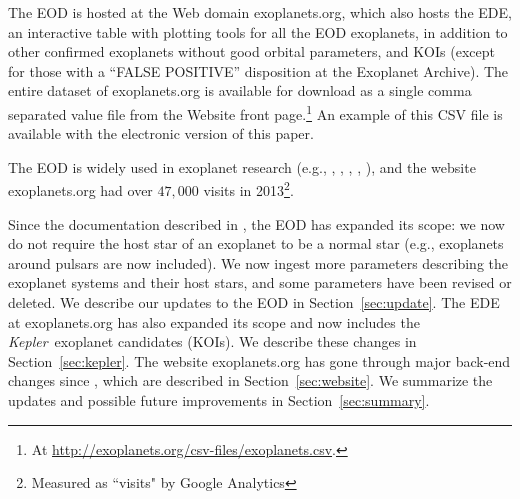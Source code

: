 \documentclass[11pt,preprint]{aastex}
\def\kepler{\textit{Kepler}}
\begin{document}
\begin{CJK*}{UTF8}{gbsn}
The EOD is hosted at the Web domain exoplanets.org, which also hosts
the EDE, an interactive table with plotting tools for all the EOD
exoplanets, in addition to other confirmed exoplanets without good
orbital parameters, and KOIs (except for those with a ``FALSE
POSITIVE'' disposition at the Exoplanet Archive). The entire dataset
of exoplanets.org is available for download as a single comma
separated value file from the Website front page.\footnote{At
  \url{http://exoplanets.org/csv-files/exoplanets.csv}.}  An example
of this CSV file is available with the electronic version of this
paper.

The EOD is widely
used in exoplanet research (e.g., \citealt{Dawson2013},
\citealt{Howard2013}, \citealt{Kipping2013}, \citealt{Kane2014},
\citealt{Weiss2014}), and the website exoplanets.org had over $47,000$ visits in
2013\footnote{Measured as ``visits" by Google Analytics}.

Since the documentation described in \cite{Wright2011}, the EOD has expanded its scope: we now do
not require the host star of an exoplanet to be a normal star (e.g.,
exoplanets around pulsars are now included). We now ingest more
parameters describing the exoplanet systems and their host stars, and some
parameters have been revised or deleted. We describe our updates to the
EOD in Section~\ref{sec:update}. The EDE at exoplanets.org has also
expanded its scope and now includes the \kepler\ exoplanet candidates
(KOIs). We describe these changes in Section~\ref{sec:kepler}. The
website exoplanets.org has gone through major back-end changes since
\cite{Wright2011}, which are described in Section~\ref{sec:website}. We
summarize the updates and possible future improvements in
Section~\ref{sec:summary}. 


\begin{comment}
Since the first peer-reviewed list of exoplanets with robust orbits
\citep{Butler2002,Butler2006}, the count of exoplanets has increased
from less than 200 to over 1490 as of March 2014
(exoplanets.org). Before the launch of NASA's \kepler\ mission
\citep{Borucki2010}, most confirmed exoplanets were discovered via the
precise radial velocity (RV) method. However, since 2009, \kepler\ has
contributed over $\sim$ 800 confirmed exoplanets (e.g.,
\ciatealt{Marcy2014}, \citealt{Rowe2014}) as well as over 3000
exoplanet candidates (\kepler\ Objects of Interest, KOIs;
e.g.~\citealt{Batalha2013}).


\end{comment}
\end{CJK*}
\end{document}
